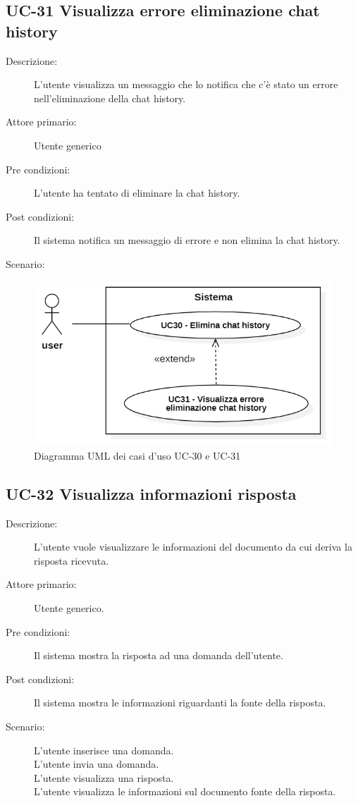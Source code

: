\subsection{UC-31 Visualizza errore eliminazione chat history }
\begin{description}
    \item[Descrizione:] L'utente visualizza un messaggio che lo notifica che c'è stato un errore nell'eliminazione della chat history.
    \item[Attore primario:] Utente generico
    \item[Pre condizioni:] L'utente ha tentato di eliminare la chat history.
    \item[Post condizioni:] Il sistema notifica un messaggio di errore e non elimina la chat history.
    \item[Scenario:] 
\end{description}

\begin{figure}[H]
    \centering
    \includegraphics[width=0.9\linewidth]{UC30-31.PNG}
    \caption{Diagramma UML dei casi d'uso UC-30 e UC-31}
    \label{fig:UC30-31}
\end{figure}

\subsection{UC-32 Visualizza informazioni risposta}
\begin{description}
    \item[Descrizione:] L'utente vuole visualizzare le informazioni del documento da cui deriva la risposta ricevuta.
    \item[Attore primario:] Utente generico.
    \item[Pre condizioni:] Il sistema mostra la risposta ad una domanda dell'utente.
    \item[Post condizioni:] Il sistema mostra le informazioni riguardanti la fonte della risposta.
    \item[Scenario:] L'utente inserisce una domanda.\\L'utente invia una domanda.\\L'utente visualizza una risposta.\\L'utente visualizza le informazioni sul documento fonte della risposta.
\end{description}

